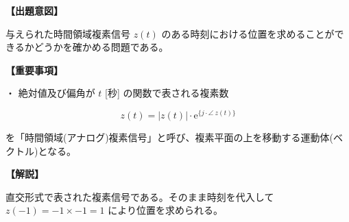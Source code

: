 \noindent \textbf{【出題意図】}

\bigskip
\noindent 与えられた時間領域複素信号 $z(t)$ のある時刻における位置を求めることができるかどうかを確かめる問題である。

\vspace{1em}
\noindent \textbf{【重要事項】}

\bigskip
\noindent ・ 絶対値及び偏角が $t$ [秒] の関数で表される複素数

\[
z(t) = |z(t)| \cdot \textrm{e}^{\{j \cdot \angle \ z(t)\}}
\]

\medskip
\noindent を「時間領域(アナログ)複素信号」と呼び、複素平面の上を移動する運動体(ベクトル)となる。

\vspace{1em}
\noindent \textbf{【解説】}

\bigskip
\noindent 直交形式で表された複素信号である。そのまま時刻を代入して $z(-1) = -1 \times -1 = 1$ により位置を求められる。

